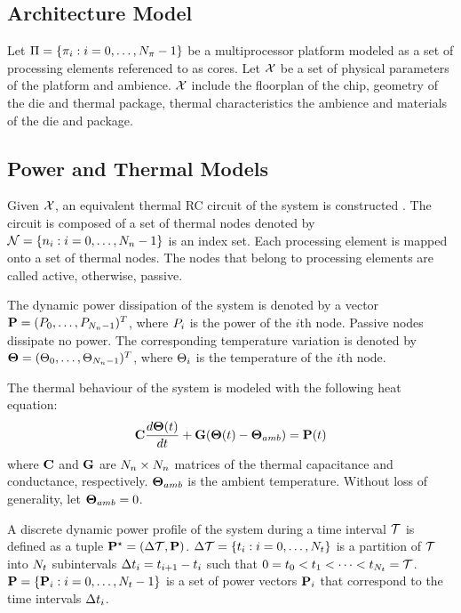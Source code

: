 \subsection{Architecture Model}
Let $\Pi = \{ \pi_i: i = 0, \dots, N_\pi - 1 \}$ be a multiprocessor platform modeled as a set of processing elements referenced to as cores. Let $\mathcal{X}$ be a set of physical parameters of the platform and ambience. $\mathcal{X}$ include the floorplan of the chip, geometry of the die and thermal package, thermal characteristics the ambience and materials of the die and package.

\subsection{Power and Thermal Models}
Given $\mathcal{X}$, an equivalent thermal RC circuit of the system is constructed \cite{kreith2000}. The circuit is composed of a set of thermal nodes denoted by $\mathcal{N} = \{ n_i: i = 0, \dots, N_n - 1 \}$ is an index set. Each processing element is mapped onto a set of thermal nodes. The nodes that belong to processing elements are called active, otherwise, passive.

The dynamic power dissipation of the system is denoted by a vector $\mathbf{P} = (P_0, \dots, P_{N_n - 1})^T$, where $P_i$ is the power of the $i$th node. Passive nodes dissipate no power. The corresponding temperature variation is denoted by $\mathbf{\Theta} = (\Theta_0, \dots, \Theta_{N_n - 1})^T$, where $\Theta_i$ is the temperature of the $i$th node.

The thermal behaviour of the system is modeled with the following heat equation:
\begin{equation} \equlabel{fourier}
  \mcapacitance \frac{d\vtemperature(\time)}{d\time} + \mconductance (\vtemperature(\time) - \vtemperature_{amb}) = \vpower(\time)
\end{equation}
where $\mathbf{C}$ and $\mathbf{G}$ are $N_n \times N_n$ matrices of the thermal capacitance and conductance, respectively. $\mathbf{\Theta}_{amb}$ is the ambient temperature. Without loss of generality, let $\mathbf{\Theta}_{amb} = 0$.

A discrete dynamic power profile of the system during a time interval $\mathcal{T}$ is defined as a tuple $\mathbf{P}^\star = (\Delta \mathcal{T}, \mathbf{P})$. $\Delta \mathcal{T} = \{ t_i: i = 0, \dots, N_t \}$ is a partition of $\mathcal{T}$ into $N_t$ subintervals $\Delta t_i = t_{i+1} - t_i$ such that $0 = t_0 < t_1 < \dots < t_{N_t} = \mathcal{T}$. $\mathbf{P} = \{ \mathbf{P}_i: i = 0, \dots, N_t - 1 \}$ is a set of power vectors $\mathbf{P}_i$ that correspond to the time intervals $\Delta t_i$.

